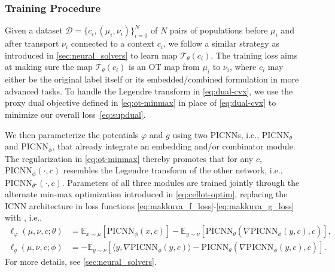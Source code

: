 \subsubsection{Training Procedure}

 Given a dataset $\mathcal{D}=\{c_i, (\mu_i, \nu_i) \}_{i=0}^N$ of $N$ pairs of populations before $\mu_i$ and after transport $\nu_i$ connected to a context $c_i$, we follow a similar strategy as introduced in \cref{sec:neural_solvers} to learn map $\mathcal{T}_\theta(c_i)$. 
The training loss aims at making sure the map $\mathcal{T}_\theta(c_i)$ is an OT map from $\mu_i$ to $\nu_i$, where $c_i$ may either be the original label itself or its embedded/combined formulation in more advanced tasks. To handle the Legendre transform in \eqref{eq:dual-cvx}, we use the proxy dual objective defined in \eqref{eq:ot-minmax} \citep{makkuva2020optimal} in place of \eqref{eq:dual-cvx} to minimize our overall loss~\eqref{eq:supdual}.

We then parameterize the potentials $\varphi$ and $g$ using two PICNNs, i.e., $\text{PICNN}_{\theta}$ and $\text{PICNN}_{\phi}$, that already integrate an embedding and/or combinator module. The regularization in \eqref{eq:ot-minmax} thereby promotes that for any $c$, $\text{PICNN}_{\phi}(\cdot,c)$ resembles the Legendre transform of the other network, i.e., $\text{PICNN}_{\theta^\star}(\cdot,c)$.
Parameters of all three modules are trained jointly through the alternate min-max optimization introduced in \eqref{eq:cellot-optim}, replacing the \acrshort{ICNN} architecture in loss functions \eqref{eq:makkuva_f_loss}-\eqref{eq:makkuva_g_loss} with , i.e.,
\begin{align*} 
    \ell_\varphi(\mu, \nu, c; \theta) &= \mathbb{E}_{x \sim \mu}[\text{PICNN}_{\phi}(x, c)] - \mathbb{E}_{y \sim \nu}[\text{PICNN}_{\theta}(\nabla \text{PICNN}_{\phi}(y, c), c)], \\
    \ell_g(\mu, \nu, c; \phi) &= -\mathbb{E}_{y \sim \nu}[\langle y, \nabla \text{PICNN}_{\phi}(y, c)\rangle-\text{PICNN}_{\theta}(\nabla \text{PICNN}_{\phi}(y, c), c)].
\end{align*}
For more details, see \cref{sec:neural_solvers}.

